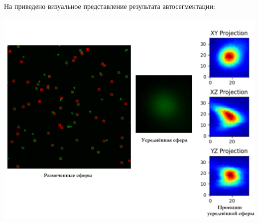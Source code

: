 \par На  приведено визуальное представление результата автосегментации:\\
\noindent %
\begin{minipage}{\textwidth}
	\centering
	\vspace{\mfloatsep} %
	\includegraphics[keepaspectratio=true,scale=0.37] {my_folder/images/autosegm/autosegm_res.png}
	\label{fig:autosegm-res}  
	\vspace{\mfloatsep} %
\end{minipage}

